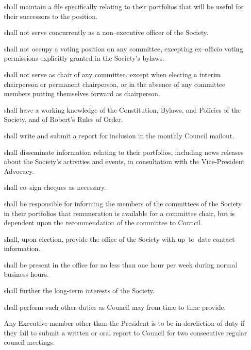 \begin{longenum}[ label*=\thesection.\arabic*., align=left]
    \item shall maintain a file specifically relating to their portfolios that will be useful for their successors to the position.
    \item shall not serve concurrently as a non--executive officer of the Society.
    \item shall not occupy a voting position on any committee, excepting ex--officio voting permissions explicitly granted in the Society's bylaws.
    \begin{longenum}[ label*=\arabic*., align=left]
		\item shall not serve as chair of any committee, except when electing a interim chairperson or permanent chairperson, or in the absence of any committee members putting themselves forward as chairperson. 
   	\end{longenum}
    \item shall have a working knowledge of the Constitution, Bylaws, and Policies of the Society, and of Robert's Rules of Order.
    \item shall write and submit a report for inclusion in the monthly Council mailout.
    \item shall disseminate information relating to their portfolios, including news releases about the Society's activities and events, in consultation with the Vice-President Advocacy.
    \item shall co--sign cheques as necessary.  
    \item shall be responsible for informing the members of the committees of the Society in their portfolios that remuneration is available for a committee chair, but is dependent upon the recommendation of the committee to Council.
    \item shall, upon election, provide the office of the Society with up--to--date contact information. 
    \item shall be present in the office for no less than one hour per week during normal business hours.
    \item shall further the long-term interests of the Society.
    \item shall perform such other duties as Council may from time to time provide.
    \item Any Executive member other than the President is to be in dereliction of duty if they fail to submit a written or oral report to Council for two consecutive regular council meetings.
\end{longenum}
